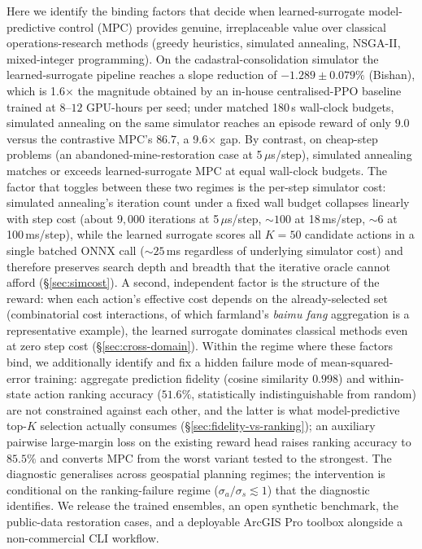 \documentclass[11pt]{article}
\begin{document}
Here we identify the binding factors that decide when learned-surrogate model-predictive control (MPC) provides genuine, irreplaceable value over classical operations-research methods (greedy heuristics, simulated annealing, NSGA-II, mixed-integer programming). On the cadastral-consolidation simulator the learned-surrogate pipeline reaches a slope reduction of $-1.289 \pm 0.079\%$ (Bishan), which is 1.6$\times$ the magnitude obtained by an in-house centralised-PPO baseline trained at $8$--$12$ GPU-hours per seed; under matched 180\,s wall-clock budgets, simulated annealing on the same simulator reaches an episode reward of only $9.0$ versus the contrastive MPC's $86.7$, a 9.6$\times$ gap. By contrast, on cheap-step problems (an abandoned-mine-restoration case at 5\,$\mu$s/step), simulated annealing matches or exceeds learned-surrogate MPC at equal wall-clock budgets. The factor that toggles between these two regimes is the per-step simulator cost: simulated annealing's iteration count under a fixed wall budget collapses linearly with step cost (about $9{,}000$ iterations at 5\,$\mu$s/step, $\sim 100$ at 18\,ms/step, $\sim 6$ at 100\,ms/step), while the learned surrogate scores all $K{=}50$ candidate actions in a single batched ONNX call ($\sim 25$\,ms regardless of underlying simulator cost) and therefore preserves search depth and breadth that the iterative oracle cannot afford (\S\ref{sec:simcost}). A second, independent factor is the structure of the reward: when each action's effective cost depends on the already-selected set (combinatorial cost interactions, of which farmland's \textit{baimu fang} aggregation is a representative example), the learned surrogate dominates classical methods even at zero step cost (\S\ref{sec:cross-domain}). Within the regime where these factors bind, we additionally identify and fix a hidden failure mode of mean-squared-error training: aggregate prediction fidelity (cosine similarity $0.998$) and within-state action ranking accuracy ($51.6\%$, statistically indistinguishable from random) are not constrained against each other, and the latter is what model-predictive top-$K$ selection actually consumes (\S\ref{sec:fidelity-vs-ranking}); an auxiliary pairwise large-margin loss \citep{burges2005learning,joachims2002optimizing,herbrich2000large} on the existing reward head raises ranking accuracy to $85.5\%$ and converts MPC from the worst variant tested to the strongest. The diagnostic generalises across geospatial planning regimes; the intervention is conditional on the ranking-failure regime ($\sigma_a / \sigma_s \lesssim 1$) that the diagnostic identifies. We release the trained ensembles, an open synthetic benchmark, the public-data restoration cases, and a deployable ArcGIS Pro toolbox alongside a non-commercial CLI workflow.
\end{document}
